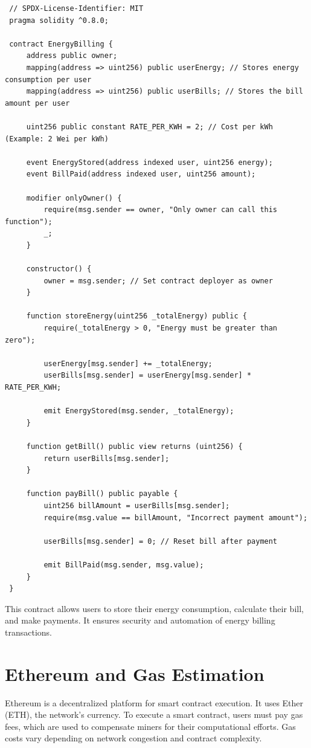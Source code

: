 \documentclass[a4paper,12pt]{report}
\begin{document}
 \begin{lstlisting}
 // SPDX-License-Identifier: MIT
 pragma solidity ^0.8.0;
 
 contract EnergyBilling {
     address public owner;
     mapping(address => uint256) public userEnergy; // Stores energy consumption per user
     mapping(address => uint256) public userBills; // Stores the bill amount per user
 
     uint256 public constant RATE_PER_KWH = 2; // Cost per kWh (Example: 2 Wei per kWh)
 
     event EnergyStored(address indexed user, uint256 energy);
     event BillPaid(address indexed user, uint256 amount);
 
     modifier onlyOwner() {
         require(msg.sender == owner, "Only owner can call this function");
         _;
     }
 
     constructor() {
         owner = msg.sender; // Set contract deployer as owner
     }
 
     function storeEnergy(uint256 _totalEnergy) public {
         require(_totalEnergy > 0, "Energy must be greater than zero");
 
         userEnergy[msg.sender] += _totalEnergy;
         userBills[msg.sender] = userEnergy[msg.sender] * RATE_PER_KWH;
 
         emit EnergyStored(msg.sender, _totalEnergy);
     }
 
     function getBill() public view returns (uint256) {
         return userBills[msg.sender];
     }
 
     function payBill() public payable {
         uint256 billAmount = userBills[msg.sender];
         require(msg.value == billAmount, "Incorrect payment amount");
 
         userBills[msg.sender] = 0; // Reset bill after payment
 
         emit BillPaid(msg.sender, msg.value);
     }
 }
 \end{lstlisting}
 
 This contract allows users to store their energy consumption, calculate their bill, and make payments. It ensures security and automation of energy billing transactions.
 
 \section{Ethereum and Gas Estimation}
 Ethereum is a decentralized platform for smart contract execution.  It uses Ether (ETH), the network's currency.  To execute a smart contract, users must pay gas fees, which are used to compensate miners for their computational efforts.  Gas costs vary depending on network congestion and contract complexity.
\end{document}

